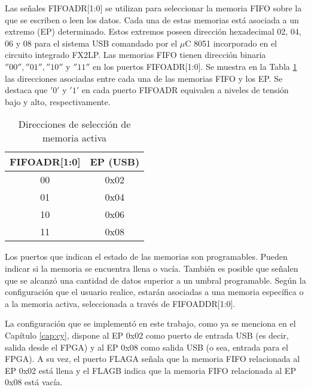 	
	Las señales FIFOADR[1:0] se utilizan para seleccionar la memoria FIFO sobre la que se escriben o leen los datos. Cada una de estas memorias está asociada a un extremo (EP) determinado. Estos extremos poseen dirección hexadecimal 02, 04, 06 y 08 para el sistema USB comandado por el $\mu$C 8051 incorporado en el circuito integrado FX2LP. Las memorias FIFO tienen dirección binaria $''00'', ''01'', ''10''$ y $''11''$ en los puertos FIFOADR[1:0]. Se muestra en la Tabla \ref{tab:fifoadr} las direcciones asociadas entre cada una de las memorias FIFO y los EP. Se destaca que $'0'$ y $'1'$ en cada puerto FIFOADR equivalen a niveles de tensión bajo y alto, respectivamente.
	
	\begin{table}[ht]
		\centering
		\begin{tabular}{cc}
			\hline
			FIFOADR[1:0] & EP (USB)\\
			\hline
			00 & 0x02\\
			01 & 0x04\\
			10 & 0x06\\
			11 & 0x08\\
			\hline
		\end{tabular}
		\caption{Direcciones de selección de memoria activa}
		\label{tab:fifoadr}
	\end{table}
	
	Los puertos que indican el estado de las memorias son programables. Pueden indicar si la memoria se encuentra llena o vacía. También es posible que señalen que se alcanzó una cantidad de datos superior a un umbral programable. Según la configuración que el usuario realice, estarán asociadas a una memoria específica o a la memoria activa, seleccionada a través de FIFOADDR[1:0].
	
	
	La configuración que se implementó en este trabajo, como ya se menciona en el Capítulo \ref{cap:cy}, dispone al EP 0x02 como puerto de entrada USB (es decir, salida desde el FPGA) y al EP 0x08 como salida USB (o sea, entrada para el FPGA). A su vez, el puerto FLAGA señala que la memoria FIFO relacionada al EP 0x02 está llena y el FLAGB indica que la memoria FIFO relacionada al EP 0x08 está vacía.
	

